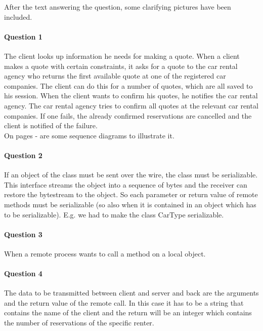 \documentclass{ds-report}
\begin{document}
	\maketitle

	After the text answering the question, some clarifying pictures have been included.

	\paragraph{Question 1} 
	The client looks up information he needs for making a quote. When a client makes a quote with certain constraints, it asks for a quote to the car rental agency who returns the first available quote at one of the registered car companies. 
	The client can do this for a number of quotes, which are all saved to his session. When the client wants to confirm his quotes, he notifies the car rental agency. The car rental agency tries to confirm all quotes at the relevant car rental companies. If one fails, the already confirmed reservations are cancelled and the client is notified of the failure.\\
	
	On pages \pageref{startSession} - \pageref{reservationFails} are some sequence diagrams to illustrate it.
	
	
	\paragraph{Question 2}
	If an object of the class must be sent over the wire, the class must be serializable. This interface streams the object into a sequence of bytes and the receiver can restore the bytestream to the object. So each parameter or return value of remote methods must be serializable  (so also when it is contained in an object which has to be serializable). E.g. we had to make the class CarType serializable. 
	
	
	\paragraph{Question 3} 
	When a remote process wants to call a method on a local object. 
	
	\paragraph{Question 4}
	The data to be transmitted between client and server and back are the arguments and the return value of the remote call. In this case it has to be a string that contains the name of the client and the return will be an integer which contains the number of reservations of the specific renter.
	
\end{document}
